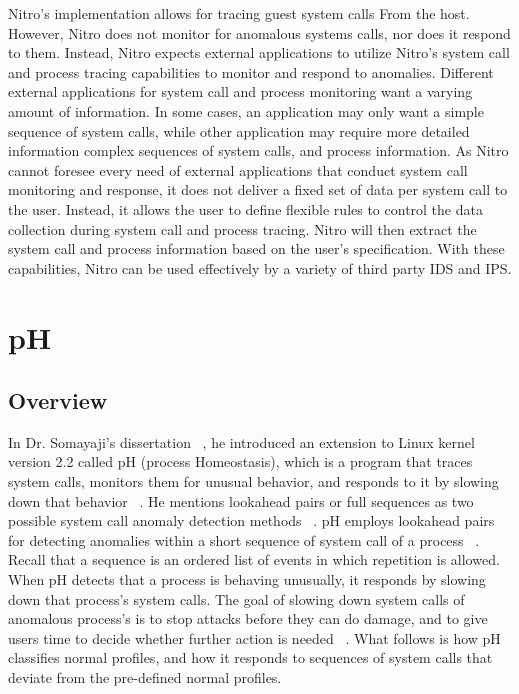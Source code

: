\documentclass{report}
\begin{document}
\begin{spacing}{1.5}
{\large
\leavevmode\newline
Nitro's implementation allows for tracing guest system calls From the host. However, Nitro does not monitor for anomalous systems calls, nor does it respond to them. Instead, Nitro expects external applications to utilize Nitro's system call and process tracing capabilities to monitor and respond to anomalies. Different external applications for system call and process monitoring want a varying amount of information. In some cases, an application may only want a simple sequence of system calls, while other application may require more detailed information complex sequences of system calls, and process information. As Nitro cannot foresee every need of external applications that conduct system call monitoring and response, it does not deliver a fixed set of data per system call to the user. Instead, it allows the user to define flexible rules to control the data collection during system call and process tracing. Nitro will then extract the system call and process information based on the user's specification. With these capabilities, Nitro can be used effectively by a variety of third party IDS and IPS.
\newline
}





\section{pH}

\subsection{Overview}

{\large
In Dr. Somayaji's dissertation ~\cite{somayaji2002operating}, he introduced an extension to Linux kernel version 2.2 called pH (process Homeostasis), which is a program that traces system calls, monitors them for unusual behavior, and responds to it by slowing down that behavior ~\cite{somayaji2002operating}. He mentions lookahead pairs or full sequences as two possible system call anomaly detection methods  ~\cite{inoue2007lookahead}. pH employs lookahead pairs for detecting anomalies within a short sequence of system call of a process ~\cite{somayaji2002operating}. Recall that a sequence is an ordered list of events in which repetition is allowed. When pH detects that a process is behaving unusually, it responds by slowing down that process’s system calls. The goal of slowing down system calls of anomalous process's is to stop attacks before they can do damage, and to give users time to decide whether further action is needed ~\cite{somayaji2002operating}. What follows is how pH classifies normal profiles, and how it responds to sequences of system calls that deviate from the pre-defined normal profiles.
\newline
}






\end{spacing}
\end{document}
